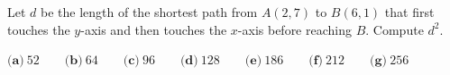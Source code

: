 Let $d$ be the length of the shortest path from $A(2,7)$ to $B(6,1)$ that first touches the $y$-axis and then touches the $x$-axis before reaching $B$. Compute $d^2$.

$\textbf{(a)}\ 52\qquad\textbf{(b)}\ 64\qquad\textbf{(c)}\ 96\qquad\textbf{(d)}\ 128\qquad\textbf{(e)}\ 186\qquad\textbf{(f)}\ 212\qquad\textbf{(g)}\ 256$
